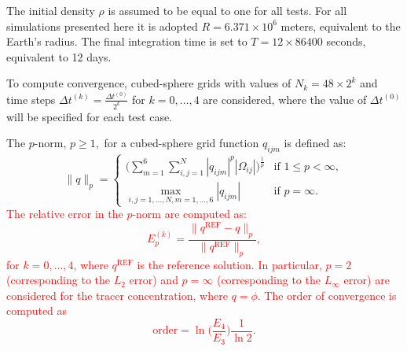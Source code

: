 \documentclass[preprint,12pt]{elsarticle}
\begin{document}
\begin{linenumbers}
The initial density $\rho$ is assumed to be equal to one for all tests.
For all simulations presented here it is adopted $R= 6.371\times 10^6$ meters, equivalent to the Earth's radius. 
The final integration time is set to $T=12 \times 86400$ seconds, equivalent to 12 days.

To compute convergence, cubed-sphere grids with values of $N_k = 48 \times 2^{k}$ and time steps $\Delta t^{(k)} = \frac{\Delta t^{(0)}}{2^k}$ for $k = 0, \ldots, 4$ are considered, where the value of $\Delta t^{(0)}$ will be specified for each test case.

The $p$-norm, $p \ge 1,$ for a cubed-sphere grid function $q_{ijm}$ is defined as:
\begin{equation}
	\label{pnorm}
	\|q\|_{p}=
	\begin{cases}
		\bigg( \sum_{m=1}^{6} \sum_{i,j=1}^{N} |q_{ijm}|^p |\Omega_{ij}|\bigg)^{\frac{1}{p}} & \text{if } 1\leq p < \infty,\\
		\max_{i,j=1, \ldots, N,m=1,\ldots,6}{|q_{ijm}|} & \text{if } p=\infty.
	\end{cases}
\end{equation}
\textcolor{red}{
The relative error in the $p$-norm are computed as:
\begin{equation}
	\label{error-pnorm}
	E_p^{(k)} = \frac{\|q^{\text{REF}}-q\|_p}{\|q^{\text{REF}}\|_p},
\end{equation}
for $k=0,\ldots,4$,
where $q^{\text{REF}}$ is the reference solution.
In particular, $p=2$ (corresponding to the $L_2$ error) and $p=\infty$ (corresponding to the $L_{\infty}$ error) are considered for the tracer concentration, where $q=\phi$.
The order of convergence is computed as
\begin{equation}
\text{order} = {\ln{\bigg(\frac{E_4}{E_{3}}\bigg)}}
\frac{1}{\ln{2}}.
\end{equation}}


\end{linenumbers}
\end{document}
